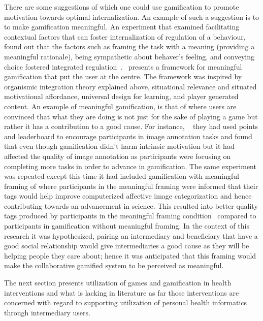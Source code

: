 There are some suggestions of which one could use gamification to promote motivation towards optimal internalization. An example of such a suggestion is to to make gamification meaningful. An experiment that examined facilitating contextual factors that can foster internalization of regulation of a behaviour, found out that the factors such as framing the task with a meaning (providing a meaningful rationale), being sympathetic about behaver's  feeling, and conveying choice fostered integrated regulation~\citep{deci1994facilitating}.~\cite{nicholson2012user} presents a framework for meaningful gamification that put the user at the centre. The framework was inspired by organismic integration theory explained above, situational relevance and situated motivational affordance, universal design for learning, and player generated content. An example of meaningful gamification, is that of where users are convinced that what they are doing is not just for the sake of playing a game but rather it has a contribution to a good cause. For instance, ~\cite{mekler2013points} they had used points and leaderboard to encourage participants in image annotation tasks and found that even though gamification didn't harm intrinsic motivation but it had affected the quality of image annotation as participants were focusing on completing more tasks in order to advance in gamification. The same experiment was repeated except this time it had included gamification with meaningful framing of where participants in the meaningful framing were informed that their tags would help improve computerized affective image categorization and hence contributing towards an advancement in science. This resulted into better quality tags produced by participants in the meaningful framing condition~\citep{mekler2013disassembling} compared to participants in gamification without meaningful framing. In the context of this research it was hypothesized, pairing an intermediary and beneficiary that have a good social relationship would give intermediaries a good cause as they will be helping people they care about; hence it was anticipated that this framing would make the collaborative gamified system to be perceived as meaningful.

The next section presents utilization of games and gamification in health interventions and what is lacking in literature as far those interventions are concerned with regard to supporting utilization of personal health informatics through intermediary users.


